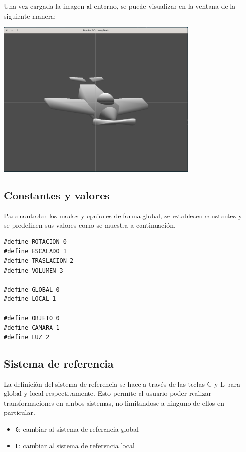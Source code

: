 \documentclass[12pt,a4paper]{article}
\begin{document}
\newpage

Una vez cargada la imagen al entorno, se puede visualizar en la ventana de la siguiente manera:

\begin{center}
\includegraphics[width=10cm]{images/transformaciones}
\end{center}

\subsection{Constantes y valores}

Para controlar los modos y opciones de forma global, se establecen constantes y se predefinen sus valores como se muestra a continuación.

\vspace{0.5cm}
\begin{lstlisting}
#define ROTACION 0
#define ESCALADO 1
#define TRASLACION 2
#define VOLUMEN 3

#define GLOBAL 0
#define LOCAL 1

#define OBJETO 0
#define CAMARA 1
#define LUZ 2

\end{lstlisting}


\subsection{Sistema de referencia}

La definición del sistema de referencia se hace a través de las teclas G y L para global y local respectivamente. Esto permite al usuario poder realizar transformaciones en ambos sistemas, no limitándose a ninguno de ellos en particular.

\begin{itemize}
  \item \texttt{G}: cambiar al sistema de referencia global
  \item \texttt{L}: cambiar al sistema de referencia local
\end{itemize}
\end{document}
